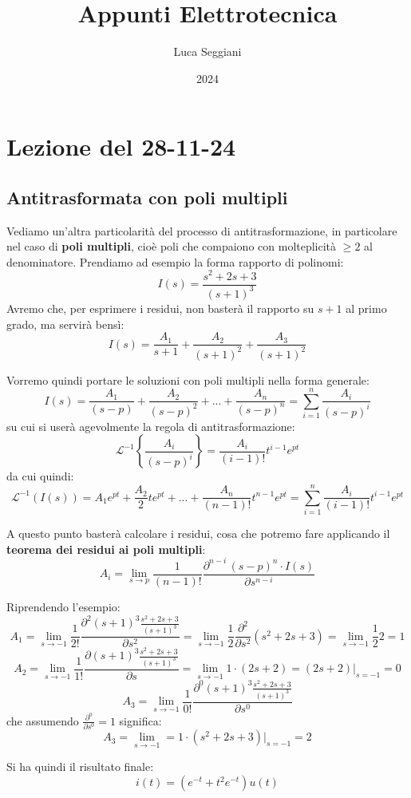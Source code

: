 \documentclass[a4paper,11pt]{article}
\title{Appunti Elettrotecnica}
\author{Luca Seggiani}
\date{2024}
\begin{document}
\section{Lezione del 28-11-24}

\thispagestyle{empty}
\pagestyle{fancy}

\subsection{Antitrasformata con poli multipli}
Vediamo un'altra particolarità del processo di antitrasformazione, in particolare nel caso di \textbf{poli multipli}, cioè poli che compaiono con molteplicità $\geq 2$ al denominatore.
Prendiamo ad esempio la forma rapporto di polinomi:
$$
I(s) = \frac{s^2 + 2s + 3}{(s+1)^3}
$$
Avremo che, per esprimere i residui, non basterà il rapporto su $s+1$ al primo grado, ma servirà bensì:
$$
I(s) = \frac{A_1}{s + 1} + \frac{A_2}{(s+1)^2} + \frac{A_3}{(s+1)^2}
$$

Vorremo quindi portare le soluzioni con poli multipli nella forma generale:
$$
I(s) = \frac{A_1}{(s-p)} + \frac{A_2}{(s-p)^2} + ... + \frac{A_n}{(s-p)^n} = \sum_{i=1}^n \frac{A_i}{(s-p)^i}
$$
su cui si userà agevolmente la regola di antitrasformazione:
$$
\mathcal{L}^{-1} \left\{ \frac{A_i}{(s-p)^i} \right\} = \frac{A_i}{(i - 1)!} t^{i-1} e^{pt}
$$
da cui quindi:
$$
\mathcal{L}^{-1}(I(s)) = A_1 e^{pt} + \frac{A_2}{2} t e^{pt} + ... + \frac{A_n}{(n-1)!} t^{n-1} e^{pt} = \sum\limits_{i=1}^n  \frac{A_i}{(i-1)!} t^{i - 1} e^{pt}
$$ 

A questo punto basterà calcolare i residui, cosa che potremo fare applicando il \textbf{teorema dei residui ai poli multipli}:
$$
A_i = \lim_{s \rightarrow p} \frac{1}{(n - 1)!} \frac{\partial^{n-i} \, (s-p)^n \cdot I(s)}{\partial s^{n-i}}
$$

Riprendendo l'esempio:
$$
A_1 = \lim_{s \rightarrow -1} \frac{1}{2!} \frac{\partial^2 (s+1)^3 \frac{s^2+2s+3}{(s+1)^3} }{\partial s^2} = \lim_{s \rightarrow -1} \frac{1}{2} \frac{\partial^2}{\partial s^2} (s^2 + 2s + 3) = \lim_{s \rightarrow -1} \frac{1}{2} 2 = 1
$$
$$
A_2 = \lim_{s \rightarrow -1} \frac{1}{1!} \frac{\partial (s+1)^3 \frac{s^2+2s+3}{(s+1)^3} }{\partial s} = \lim_{s \rightarrow -1} 1 \cdot (2s + 2) = (2s + 2) \Big|_{s = -1} = 0
$$
$$
A_3 = \lim_{s \rightarrow -1} \frac{1}{0!} \frac{\partial^0 (s+1)^3 \frac{s^2+2s+3}{(s+1)^3} }{\partial s^0}
$$
che assumendo $\frac{\partial^0}{\partial s^0} = 1$ significa:
$$
A_3 = \lim_{s \rightarrow -1} = 1 \cdot (s^2 +2s +3) \Big|_{s=-1} = 2
$$

Si ha quindi il risultato finale:
$$
i(t) = \left( e^{-t} + t^2 e^{-t} \right) u(t)
$$
\end{document}
